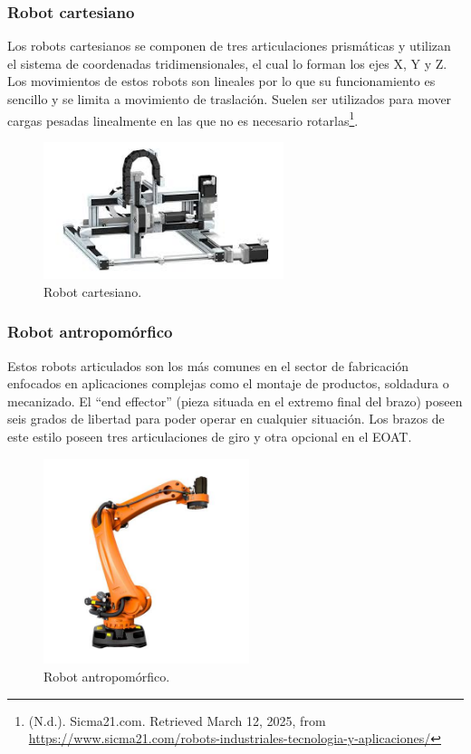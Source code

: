 \subsubsection{Robot cartesiano}

Los robots cartesianos se componen de tres articulaciones prismáticas y utilizan el sistema de coordenadas tridimensionales, el cual lo forman los ejes X, Y y Z. Los movimientos de estos robots son lineales por lo que su funcionamiento es sencillo y se limita a movimiento de traslación. Suelen ser utilizados para mover cargas pesadas linealmente en las que no es necesario rotarlas\footnote{(N.d.). Sicma21.com. Retrieved March 12, 2025, from  \url{https://www.sicma21.com/robots-industriales-tecnologia-y-aplicaciones/}}. 

\begin{figure} [h!]
  \begin{center}
    \includegraphics[width=7cm]{figs/robot_cartesiano}
  \end{center}
  \caption{\centering Robot cartesiano.}
  \label{fig:robot_cartesiano}
\end{figure} 

\subsubsection{Robot antropomórfico}

Estos robots articulados son los más comunes en el sector de fabricación enfocados en aplicaciones complejas como el montaje de productos, soldadura o mecanizado. El ``end effector'' (pieza situada en el extremo final del brazo) poseen seis grados de libertad para poder operar en cualquier situación. Los brazos de este estilo poseen tres articulaciones de giro y otra opcional en el EOAT.

\begin{figure} [h!]
  \begin{center}
    \includegraphics[width=6cm]{figs/robot_antropomorfico}
  \end{center}
  \caption{\centering Robot antropomórfico.}
  \label{fig:robot_antropomorfico}
\end{figure} 

